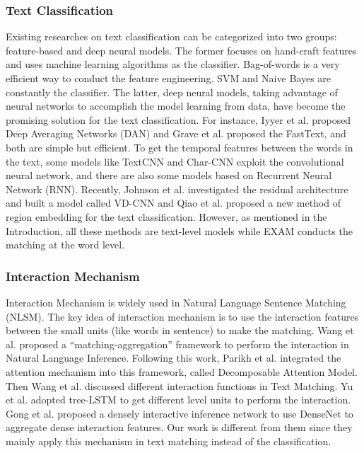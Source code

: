 \documentclass[letterpaper]{article} %
\begin{document}
\subsubsection{Text Classification}

Existing researches on text classification can be categorized into two groups: feature-based and deep neural models. The former focuses on hand-craft features and uses machine learning algorithms as the classifier. Bag-of-words \cite{bow} is a very efficient way to conduct the feature engineering. SVM and Naive Bayes are constantly the classifier. The latter, deep neural models, taking advantage of neural networks to accomplish the model learning from data, have become the promising solution for the text classification. For instance, Iyyer et al.  proposed Deep Averaging Networks (DAN) and Grave et al.  proposed the FastText, and both are simple but efficient. To get the temporal features between the words in the text, some models like TextCNN \cite{TextCNN} and Char-CNN \cite{charcnn} exploit the convolutional neural network, and there are also some models based on Recurrent Neural Network (RNN). Recently, Johnson et al.  investigated the residual architecture and built a model called VD-CNN and Qiao et al.  proposed a new method of region embedding for the text classification. However, as mentioned in the Introduction, all these methods are text-level models while EXAM conducts the matching at the word level.%
\subsubsection{Interaction Mechanism}
Interaction Mechanism is widely used in Natural Language Sentence Matching (NLSM). The key idea of interaction mechanism is to use the interaction features between the small units (like words in sentence) to make the matching. Wang et al.  proposed a ``matching-aggregation'' framework to perform the interaction in Natural Language Inference. Following this work, Parikh et al.  integrated the attention mechanism into this framework, called Decomposable Attention Model. Then Wang et al.  discussed different interaction functions in Text Matching. Yu et al.  adopted tree-LSTM to get different level units to perform the interaction. %
Gong et al.  proposed a densely interactive inference network to use DenseNet to aggregate dense interaction features. Our work is different from them since they mainly apply this mechanism in text matching instead of the classification. %
\end{document}
